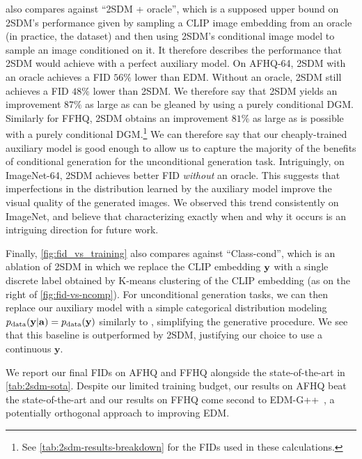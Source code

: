  also compares against ``2SDM + oracle'', which is a supposed upper bound on 2SDM's performance given by sampling a CLIP image embedding from an oracle (in practice, the dataset) and then using 2SDM's conditional image model to sample an image conditioned on it. It therefore describes the performance that 2SDM would achieve with a perfect auxiliary model. On AFHQ-64, 2SDM with an oracle achieves a FID $56\%$ lower than EDM. Without an oracle, 2SDM still achieves a FID $48\%$ lower than 2SDM. We therefore say that 2SDM yields an improvement $87\%$ as large as can be gleaned by using a purely conditional DGM. Similarly for FFHQ, 2SDM obtains an improvement $81\%$ as large as is possible with a purely conditional DGM.\footnote{See \cref{tab:2sdm-results-breakdown} for the FIDs used in these calculations.} We can therefore say that our cheaply-trained auxiliary model is good enough to allow us to capture the majority of the benefits of conditional generation for the unconditional generation task. Intriguingly,
 on ImageNet-64, 2SDM achieves better FID \textit{without} an oracle. This suggests that imperfections in the distribution
learned by the auxiliary model improve the visual quality of the generated images. We observed this trend consistently on ImageNet, and believe that characterizing exactly when and why it occurs is an intriguing direction for future work.

Finally, \cref{fig:fid_vs_training} also compares against ``Class-cond'', which is an ablation of 2SDM in which we replace the CLIP embedding ${\mathbf{y}}$ with a single discrete label obtained by K-means clustering of the CLIP embedding (as on the right of \cref{fig:fid-vs-ncomp}). For unconditional generation tasks, we can then replace our auxiliary model with a simple categorical distribution modeling $p_{\rm{data}}({\mathbf{y}}|{\mathbf{a}})=p_{\rm{data}}({\mathbf{y}})$ similarly to \citet{hu2022self}, simplifying the generative procedure. We see that this baseline is outperformed by 2SDM, justifying our choice to use a continuous $\mathbf{y}$.

We report our final FIDs on AFHQ and FFHQ alongside the state-of-the-art in \cref{tab:2sdm-sota}. Despite our limited training budget, our results on AFHQ beat the state-of-the-art and our results on FFHQ come second to EDM-G++~\citep{kim2022refining}, a potentially orthogonal approach to improving EDM.

